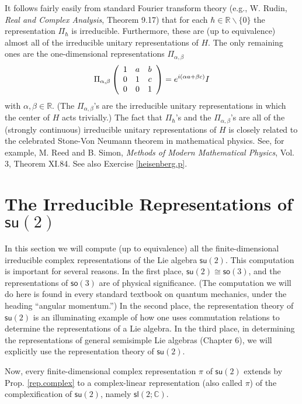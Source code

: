 \documentclass[12pt]{amsbook}
\theoremstyle{plain}
\numberwithin{equation}{chapter}
\numberwithin{theorem}{chapter}
\begin{document}
It follows fairly easily from standard Fourier transform theory (e.g., W.
Rudin, \textit{Real and Complex Analysis}, Theorem 9.17) that for each
$\hbar\in\mathbb{R}\backslash\{0\}$ the representation $\Pi_{\hbar}$ is
irreducible. Furthermore, these are (up to equivalence) almost all of the
irreducible unitary representations of $H$. The only remaining ones are the
one-dimensional representations $\Pi_{\alpha,\beta}$%
\[
\Pi_{\alpha,\beta}\left(
\begin{array}
[c]{ccc}%
1 & a & b\\
0 & 1 & c\\
0 & 0 & 1
\end{array}
\right)  =e^{i(\alpha a+\beta c)}I
\]
with $\alpha,\beta\in\mathbb{R}$. (The $\Pi_{\alpha,\beta}$'s are the
irreducible unitary representations in which the center of $H$ acts
trivially.) The fact that $\Pi_{\hbar}$'s and the $\Pi_{\alpha,\beta}$'s are
all of the (strongly continuous) irreducible unitary representations of $H$ is
closely related to the celebrated Stone-Von Neumann theorem in mathematical
physics. See, for example, M. Reed and B. Simon, \textit{Methods of Modern
Mathematical Physics}, Vol. 3, Theorem XI.84. See also Exercise
\ref{heisenberg.p}.

\section{The Irreducible Representations of $\mathsf{su}(2)$}

In this section we will compute (up to equivalence) all the finite-dimensional
irreducible complex representations of the Lie algebra $\mathsf{su}(2)$. This
computation is important for several reasons. In the first place,
$\mathsf{su}(2)\cong\mathsf{so}(3)$, and the representations of $\mathsf{so}%
(3)$ are of physical significance. (The computation we will do here is found
in every standard textbook on quantum mechanics, under the heading ``angular
momentum.'') In the second place, the representation theory of $\mathsf{su}%
(2)$ is an illuminating example of how one uses commutation relations to
determine the representations of a Lie algebra. In the third place, in
determining the representations of general semisimple Lie algebras (Chapter
6), we will explicitly use the representation theory of $\mathsf{su}(2)$.

Now, every finite-dimensional complex representation $\pi$ of $\mathsf{su}(2)$
extends by Prop. \ref{rep.complex} to a complex-linear representation (also
called $\pi$) of the complexification of $\mathsf{su}(2)$, namely
$\mathsf{sl}(2;\mathbb{C})$.
\end{document}
